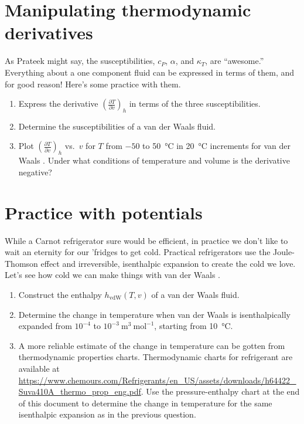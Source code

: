 \documentclass[11pt]{article}
\begin{document}
\section{Manipulating thermodynamic derivatives}
\label{sec:org2928881}
As Prateek might say, the susceptibilities, \(c_P\), \(\alpha\), and \(\kappa_T\), are
  ``awesome.'' Everything about a one component fluid can be expressed in
  terms of them, and for good reason! Here's some practice with them.
\begin{enumerate}
\item Express the derivative \(\left ( \frac{\partial T}{\partial v} \right )_h\) in terms
of the three susceptibilities.

\item Determine the susceptibilities of a van der Waals fluid.

\item Plot \(\left ( \frac{\partial T}{\partial v} \right )_h\)  vs.~\(v\) for \(T\) from \(-50\) to
\SI{50}{\celsius} in \SI{20}{\celsius} increments for van der Waals . Under what
conditions of temperature and volume is the derivative negative?
\end{enumerate}

\section{Practice with potentials}
\label{sec:org732c740}
While a Carnot refrigerator sure would be efficient, in practice we don't
  like to wait an eternity for our 'fridges to get cold.  Practical refrigerators use the
  Joule-Thomson effect and irreversible, isenthalpic expansion to create the cold we
  love.  Let's see how cold we can make things with van der Waals .

\begin{enumerate}
\item Construct the enthalpy \(h_\text{vdW}(T,v)\) of a van der Waals fluid.

\item Determine the change in temperature when van der Waals  is isenthalpically
expanded from \(10^{-4}\) to \(10^{-3}~\text{m}^3~\text{mol}^{-1}\), starting from \SI{10}{\celsius}.

\item A more reliable estimate of the change in temperature can be gotten from thermodynamic properties charts.  Thermodynamic charts for  refrigerant are available at \url{https://www.chemours.com/Refrigerants/en_US/assets/downloads/h64422_Suva410A_thermo_prop_eng.pdf}.  Use the pressure-enthalpy chart at the end of this document to determine the change in temperature for the same isenthalpic expansion as in the previous question.
\end{enumerate}
\end{document}
